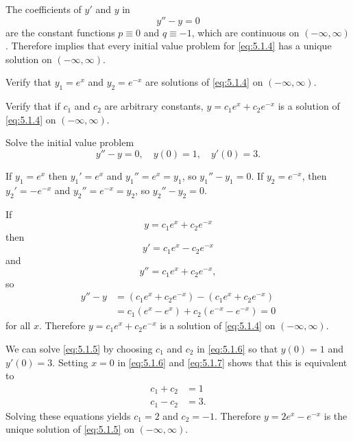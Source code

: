 \begin{example}\label{example:5.1.1}
The coefficients of $y'$ and $y$ in
\begin{equation}\label{eq:5.1.4}
y''-y=0
\end{equation}
are the constant functions $p\equiv0$ and $q\equiv-1$, which are
continuous on $(-\infty,\infty)$. Therefore 
implies that every initial value problem for \eqref{eq:5.1.4}  has a
unique solution on $(-\infty,\infty)$.
\begin{alist}
\item %
Verify that $y_1=e^x$ and $y_2=e^{-x}$ are solutions of
\eqref{eq:5.1.4} on $(-\infty,\infty)$.
\item %
Verify that if $c_1$ and $c_2$ are arbitrary constants,
$y=c_1e^x+c_2e^{-x}$ is a solution of \eqref{eq:5.1.4} on
$(-\infty,\infty)$.
\item %
Solve the initial value problem
\begin{equation}\label{eq:5.1.5}
y''-y=0,\quad y(0)=1,\quad y'(0)=3.
\end{equation}
\end{alist}
\end{example}

\begin{alistSolution}
\item If $y_1=e^x$ then $y_1'=e^x$ and $y_1''=e^x=y_1$,
so  $y_1''-y_1=0$.
If $y_2=e^{-x}$, then $y_2'=-e^{-x}$ and $y_2''=e^{-x}=y_2$,
so  $y_2''-y_2=0$.

\item If
\begin{equation}\label{eq:5.1.6}
y=c_1e^x+c_2e^{-x}
\end{equation}
 then
\begin{equation}\label{eq:5.1.7}
y'=c_1e^x-c_2e^{-x}
\end{equation}
and
\[
y''=c_1e^x+c_2e^{-x},
\]
 so
\begin{align*}
y''-y&=(c_1e^x+c_2e^{-x})-(c_1e^x+c_2e^{-x})\\
&=c_1(e^x-e^x)+c_2(e^{-x}-e^{-x})=0
\end{align*}
for all $x$. Therefore $y=c_1e^x+c_2e^{-x}$ is a solution of
\eqref{eq:5.1.4} on $(-\infty,\infty)$.

\item
We can solve \eqref{eq:5.1.5} by choosing $c_1$ and $c_2$ in \eqref{eq:5.1.6}
so that $y(0)=1$ and $y'(0)=3$. Setting $x=0$ in \eqref{eq:5.1.6} and
\eqref{eq:5.1.7} shows that this is equivalent to
\begin{align*}
c_1+c_2&=1\\
c_1-c_2&=3.
\end{align*}
Solving these equations yields  $c_1=2$  and $c_2=-1$.
Therefore $y=2e^x-e^{-x}$ is the unique solution of
\eqref{eq:5.1.5} on $(-\infty,\infty)$.
\end{alistSolution}

